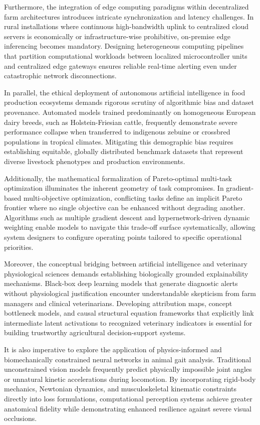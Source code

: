 \documentclass[Times,12pt,oneside,openany,print,index]{report}
\begin{document}
Furthermore, the integration of edge computing paradigms within decentralized farm architectures introduces intricate synchronization and latency challenges. In rural installations where continuous high-bandwidth uplink to centralized cloud servers is economically or infrastructure-wise prohibitive, on-premise edge inferencing becomes mandatory. Designing heterogeneous computing pipelines that partition computational workloads between localized microcontroller units and centralized edge gateways ensures reliable real-time alerting even under catastrophic network disconnections.

In parallel, the ethical deployment of autonomous artificial intelligence in food production ecosystems demands rigorous scrutiny of algorithmic bias and dataset provenance. Automated models trained predominantly on homogeneous European dairy breeds, such as Holstein-Friesian cattle, frequently demonstrate severe performance collapse when transferred to indigenous zebuine or crossbred populations in tropical climates. Mitigating this demographic bias requires establishing equitable, globally distributed benchmark datasets that represent diverse livestock phenotypes and production environments.

Additionally, the mathematical formalization of Pareto-optimal multi-task optimization illuminates the inherent geometry of task compromises. In gradient-based multi-objective optimization, conflicting tasks define an implicit Pareto frontier where no single objective can be enhanced without degrading another. Algorithms such as multiple gradient descent and hypernetwork-driven dynamic weighting enable models to navigate this trade-off surface systematically, allowing system designers to configure operating points tailored to specific operational priorities.

Moreover, the conceptual bridging between artificial intelligence and veterinary physiological sciences demands establishing biologically grounded explainability mechanisms. Black-box deep learning models that generate diagnostic alerts without physiological justification encounter understandable skepticism from farm managers and clinical veterinarians. Developing attribution maps, concept bottleneck models, and causal structural equation frameworks that explicitly link intermediate latent activations to recognized veterinary indicators is essential for building trustworthy agricultural decision-support systems.

It is also imperative to explore the application of physics-informed and biomechanically constrained neural networks in animal gait analysis. Traditional unconstrained vision models frequently predict physically impossible joint angles or unnatural kinetic accelerations during locomotion. By incorporating rigid-body mechanics, Newtonian dynamics, and musculoskeletal kinematic constraints directly into loss formulations, computational perception systems achieve greater anatomical fidelity while demonstrating enhanced resilience against severe visual occlusions.
\end{document}

